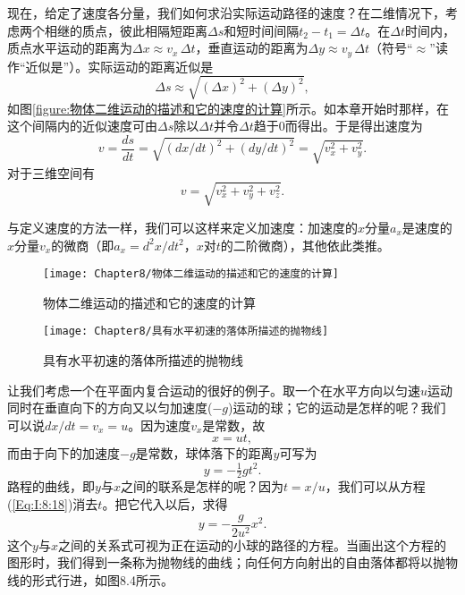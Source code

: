 现在，给定了速度各分量，我们如何求沿实际运动路径的速度？在二维情况下，考虑两个相继的质点，彼此相隔短距离$\Delta s$和短时间间隔$t_2-t_1=\Delta t$。在$\Delta t$时间内，质点水平运动的距离为$\Delta x\approx v_x\,\Delta t$，垂直运动的距离为$\Delta y\approx v_y\,\Delta t$（符号“$\approx$”读作“近似是”）。实际运动的距离近似是
\begin{equation}
\label{Eq:I:8:14}
\Delta s\approx\sqrt{(\Delta x)^2+(\Delta y)^2},
\end{equation}
如图\ref{figure:物体二维运动的描述和它的速度的计算}所示。如本章开始时那样，在这个间隔内的近似速度可由$\Delta s$除以$\Delta t$并令$\Delta t$趋于0而得出。于是得出速度为
\begin{equation}
\label{Eq:I:8:15}
v=\frac{ds}{dt}=\sqrt{(dx/dt)^2+(dy/dt)^2}=\sqrt{v_x^2+v_y^2}.
\end{equation}
对于三维空间有
\begin{equation}
\label{Eq:I:8:16}
v=\sqrt{v_x^2+v_y^2+v_z^2}.
\end{equation}

与定义速度的方法一样，我们可以这样来定义加速度：加速度的$x$分量$a_x$是速度的$x$分量$v_x$的微商（即$a_x=d^2x/dt^2$，$x$对$t$的二阶微商），其他依此类推。

\begin{figure}[htbp]
    \centering
    \begin{minipage}[t]{0.45\textwidth}
        \centering
        \texttt{[image: Chapter8/物体二维运动的描述和它的速度的计算]}
        \caption{物体二维运动的描述和它的速度的计算}
        \label{figure:物体二维运动的描述和它的速度的计算}
    \end{minipage}
    \begin{minipage}[t]{0.45\textwidth}
        \centering
        \texttt{[image: Chapter8/具有水平初速的落体所描述的抛物线]}    
        \caption{具有水平初速的落体所描述的抛物线}
        \label{figure:具有水平初速的落体所描述的抛物线}
    \end{minipage}
\end{figure}

让我们考虑一个在平面内复合运动的很好的例子。取一个在水平方向以匀速$u$运动同时在垂直向下的方向又以匀加速度($-g$)运动的球；它的运动是怎样的呢？我们可以说$dx/dt=v_x=u$。因为速度$v_x$是常数，故
\begin{equation}
\label{Eq:I:8:17}
x=ut,
\end{equation}
而由于向下的加速度$-g$是常数，球体落下的距离$y$可写为
\begin{equation}
\label{Eq:I:8:18}
y=-\tfrac{1}{2}gt^2.
\end{equation}
路程的曲线，即$y$与$x$之间的联系是怎样的呢？因为$t=x/u$，我们可以从方程(\ref{Eq:I:8:18})消去$t$。把它代入以后，求得
\begin{equation}
    \label{Eq:I:8:19}
    y=-\frac{g}{2u^2}x^2.
\end{equation}
这个$y$与$x$之间的关系式可视为正在运动的小球的路径的方程。当画出这个方程的图形时，我们得到一条称为抛物线的曲线；向任何方向射出的自由落体都将以抛物线的形式行进，如图8.4所示。 
